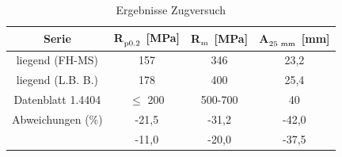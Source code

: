 \begin{table}[h]
  \centering
  \caption{Ergebnisse Zugversuch}
  \begin{tabular}{cccc}
  \toprule
  \textbf{Serie} & \textbf{R$_{\textsubscript{p0.2}}$ [MPa]} & \textbf{R$_{\textsubscript{m}}$ [MPa]} & \textbf{A$_{\textsubscript{25 mm}}$ [mm]} \\
  \midrule
  liegend (FH-MS) & 157 & 346 & 23,2 \\
  liegend (L.B. B.) & 178 & 400 & 25,4 \\
  Datenblatt 1.4404 \autocite{AGSTSteel:1.4404} & $\leq$ 200 & 500-700 & 40 \\
  \midrule
  Abweichungen (\%) 
    & -21,5 & -31,2 & -42,0 \\
    & -11,0 & -20,0 & -37,5 \\
  \bottomrule
  \end{tabular}
\label{tab:ErgebnisseZugversuch}
\end{table}


